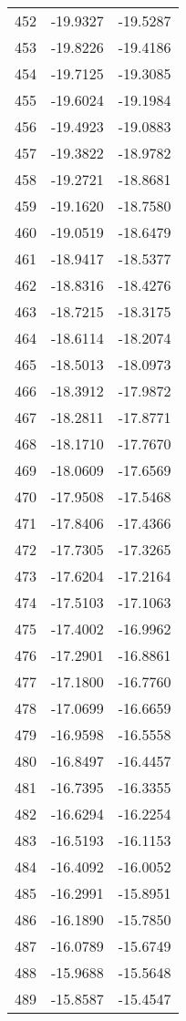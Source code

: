 \documentclass{article}
\begin{document}
\begin{longtable}{|c|c|c|}
452 & -19.9327 & -19.5287 \\
453 & -19.8226 & -19.4186 \\
454 & -19.7125 & -19.3085 \\
455 & -19.6024 & -19.1984 \\
456 & -19.4923 & -19.0883 \\
457 & -19.3822 & -18.9782 \\
458 & -19.2721 & -18.8681 \\
459 & -19.1620 & -18.7580 \\
460 & -19.0519 & -18.6479 \\
461 & -18.9417 & -18.5377 \\
462 & -18.8316 & -18.4276 \\
463 & -18.7215 & -18.3175 \\
464 & -18.6114 & -18.2074 \\
465 & -18.5013 & -18.0973 \\
466 & -18.3912 & -17.9872 \\
467 & -18.2811 & -17.8771 \\
468 & -18.1710 & -17.7670 \\
469 & -18.0609 & -17.6569 \\
470 & -17.9508 & -17.5468 \\
471 & -17.8406 & -17.4366 \\
472 & -17.7305 & -17.3265 \\
473 & -17.6204 & -17.2164 \\
474 & -17.5103 & -17.1063 \\
475 & -17.4002 & -16.9962 \\
476 & -17.2901 & -16.8861 \\
477 & -17.1800 & -16.7760 \\
478 & -17.0699 & -16.6659 \\
479 & -16.9598 & -16.5558 \\
480 & -16.8497 & -16.4457 \\
481 & -16.7395 & -16.3355 \\
482 & -16.6294 & -16.2254 \\
483 & -16.5193 & -16.1153 \\
484 & -16.4092 & -16.0052 \\
485 & -16.2991 & -15.8951 \\
486 & -16.1890 & -15.7850 \\
487 & -16.0789 & -15.6749 \\
488 & -15.9688 & -15.5648 \\
489 & -15.8587 & -15.4547 \\

\end{longtable}
\end{document}
